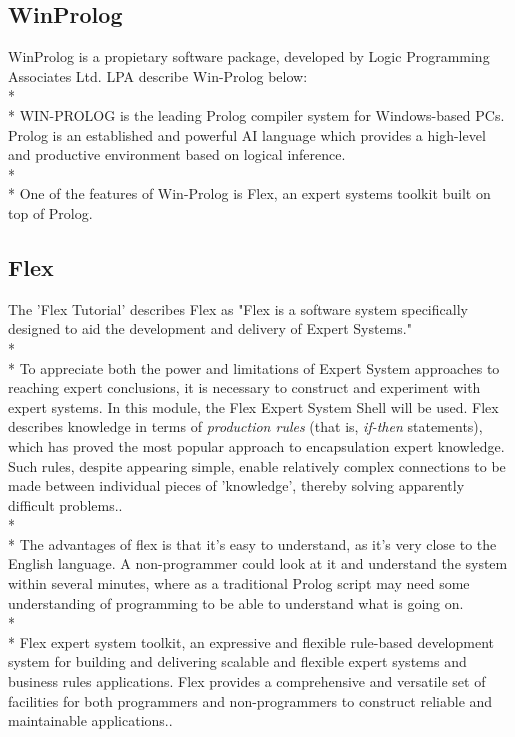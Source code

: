 \documentclass[12pt]{report}
\begin{document}
\subsection{WinProlog}\label{subsec:winprolog}
WinProlog is a propietary software package, developed by Logic Programming Associates Ltd.  LPA describe Win-Prolog below:
\\*
\\*
WIN-PROLOG is the leading Prolog compiler system for Windows-based PCs. Prolog is an established and powerful AI language which provides a high-level and productive environment based on logical inference.\citep{lpawinprolog}
\\*
\\*
One of the features of Win-Prolog is Flex, an expert systems toolkit built on top of Prolog.

\subsection{Flex}\label{subsec:flex}
The 'Flex Tutorial' describes Flex as "Flex is a software system specifically designed to aid the development and delivery of Expert Systems."
\\*
\\*
To appreciate both the power and limitations of Expert System approaches to reaching expert conclusions, it is necessary to construct and experiment with expert systems.  In this module, the Flex Expert System Shell will be used.  Flex describes knowledge in terms of \textit{production rules} (that is, \textit{if-then} statements), which has proved the most popular approach to encapsulation expert knowledge.  Such rules, despite appearing simple, enable relatively complex connections to be made between individual pieces of 'knowledge', thereby solving apparently difficult problems.\citep{flexsystems09}.
\\*
\\*
The advantages of flex is that it's easy to understand, as it's very close to the English language.  A non-programmer could look at it and understand the system within several minutes, where as a traditional Prolog script may need some understanding of programming to be able to understand what is going on.
\\*
\\*
Flex expert system toolkit, an expressive and flexible rule-based development system for building and delivering scalable and flexible expert systems and business rules applications. Flex provides a comprehensive and versatile set of facilities for both programmers and non-programmers to construct reliable and maintainable applications.\citep{lpawinprolog-flex}.
\end{document}
